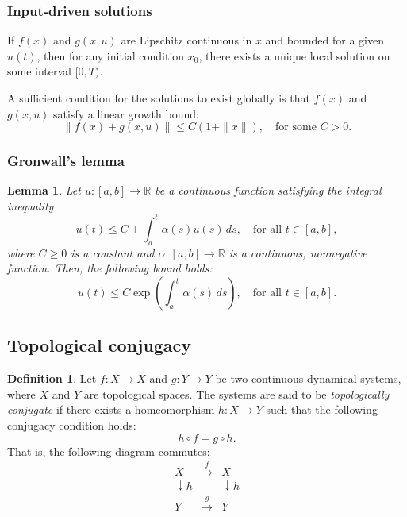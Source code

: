 \documentclass{article}
\newtheorem{lemma}{Lemma}
\theoremstyle{definition} \newtheorem{definition}{Definition}
\theoremstyle{remark} \newtheorem{remark}{Remark}
\newcounter{ct}
\begin{document}

\subsubsection{Input-driven solutions}\label{sec:inputunique}
If \( f(x) \) and \( g(x,u) \) are Lipschitz continuous in \( x \) and bounded for a given \( u(t) \), then for any initial condition \( x_0 \), there exists a unique local solution on some interval \( [0,T) \).  

A sufficient condition for the solutions to exist globally is that \( f(x) \) and \( g(x,u) \) satisfy a linear growth bound:  
\[
\| f(x) + g(x,u) \| \leq C (1 + \| x \|), \quad \text{for some } C > 0.
\]



\subsubsection{Gronwall's lemma}\label{sec:gronwall}
\begin{lemma}\label{lemma:gronwall}
Let \( u: [a,b] \to \mathbb{R} \) be a continuous function satisfying the integral inequality
\[
u(t) \leq C + \int_a^t \alpha(s) u(s) \, ds, \quad \text{for all } t \in [a,b],
\]
where \( C \geq 0 \) is a constant and \( \alpha: [a,b] \to \mathbb{R} \) is a continuous, nonnegative function. Then, the following bound holds:
\[
u(t) \leq C \exp \left( \int_a^t \alpha(s) \, ds \right), \quad \text{for all } t \in [a,b].
\]
\end{lemma}



\subsection{Topological conjugacy}\label{sec:top_conj}
\begin{definition}
Let \( f: X \to X \) and \( g: Y \to Y \) be two continuous dynamical systems, where \( X \) and \( Y \) are topological spaces.
 The systems are said to be \emph{topologically conjugate} if there exists a homeomorphism \( h: X \to Y \) such that the following conjugacy condition holds:
\[
h \circ f = g \circ h.
\]
That is, the following diagram commutes:
\[
\begin{array}{ccc}
X & \xrightarrow{f} & X \\
\downarrow h &  & \downarrow h \\
Y & \xrightarrow{g} & Y
\end{array}
\]
\end{definition}
\end{document}
